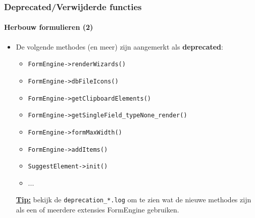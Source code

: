 
\begin{frame}[fragile]
	\frametitle{Deprecated/Verwijderde functies}
	\framesubtitle{Herbouw formulieren (2)}

	\begin{itemize}

		\item De volgende methodes (en meer) zijn aangemerkt als \textbf{deprecated}:

			\begin{itemize}
				\item \texttt{FormEngine->renderWizards()}
				\item \texttt{FormEngine->dbFileIcons()}
				\item \texttt{FormEngine->getClipboardElements()}
				\item \texttt{FormEngine->getSingleField\_typeNone\_render()}
				\item \texttt{FormEngine->formMaxWidth()}
				\item \texttt{FormEngine->addItems()}
				\item \texttt{SuggestElement->init()}
				\item ...
			\end{itemize}

		\small
			\underline{\textbf{Tip:}}
			bekijk de \texttt{deprecation\_*.log} om te zien wat de nieuwe methodes zijn als een of meerdere
			extensies FormEngine gebruiken.
		\normalsize

	\end{itemize}

\end{frame}


